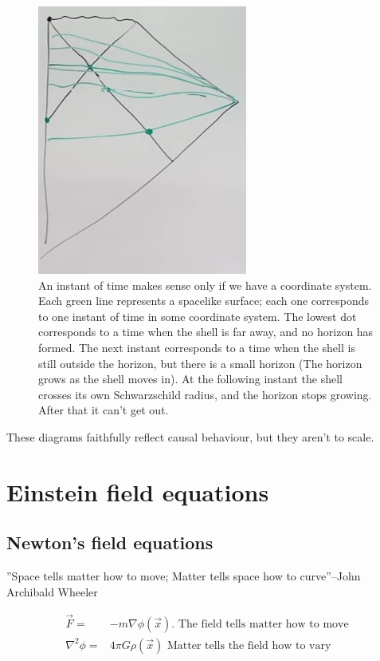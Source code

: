 \documentclass[]{article}
\begin{document}
{\begin{figure}[H]
	\begin{center}
		\caption[The event horizon forms before shell gets there!]{An instant of time makes sense only if we have a coordinate system. Each green line represents a spacelike surface; each one corresponds to one instant of time in some coordinate system. The lowest dot corresponds to a time when the shell is far away, and no horizon has formed. The next instant corresponds to a time when the shell is still outside the horizon, but there is a small horizon (The horizon grows as the shell moves in). At the following instant the shell crosses its own Schwarzschild radius, and the horizon stops growing. After that it can't get out.}\label{fig:gr-8-instants-of-time}
		\includegraphics{gr-8-instants-of-time}
	\end{center}
\end{figure}

These diagrams faithfully reflect causal behaviour, but they aren't to scale.

\section{Einstein field equations}

\subsection{Newton's field equations}

''Space tells matter how to move; Matter tells space how to curve''--John Archibald Wheeler

\begin{align*}
	\vec{F}=& -m \nabla \phi(\vec{x}) \text{. The field tells matter how to move}\\
	\nabla^2 \phi =& 4 \pi G \rho(\vec{x}) \text{ Matter tells the field how to vary}
\end{align*}

}
\end{document}
